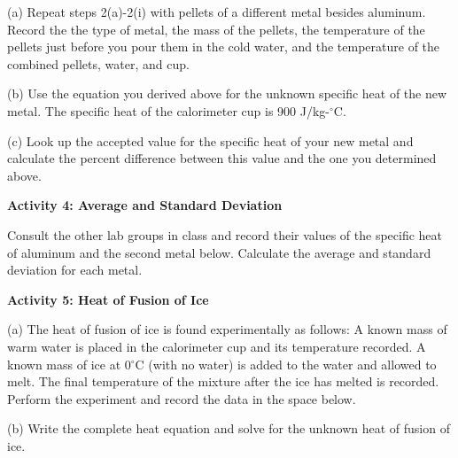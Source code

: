 (a) Repeat steps 2(a)-2(i) with pellets of a different metal besides aluminum.
Record the the type of metal, the mass of the pellets, the temperature of the
pellets just before you pour them in the cold water, and the temperature of the
combined pellets, water, and cup.
\vspace{15mm}

\newpage 

(b) Use the equation you derived above for the unknown specific
heat of the new metal. 
The specific heat of the calorimeter cup is 900 J/kg-\( ^{\circ } \)C.

\vspace{2.5cm}

(c) Look up the accepted value for the specific heat of your new metal and
calculate the percent difference between this value and the one you
determined above. 
\vspace{25mm}

\textbf{Activity 4: Average and Standard Deviation}

Consult the other lab groups in class and record their values of the specific
heat of aluminum and the second metal below.
Calculate the average and standard deviation for each metal.
\vspace{2in}


\textbf{Activity 5: Heat of Fusion of Ice}

(a) The heat of fusion of ice is found experimentally as follows:
A known mass of warm water is placed in the calorimeter cup and its
temperature recorded. A known mass of ice at 0\( ^{\circ } \)C (with
no water) is added to the water and allowed to melt. The final temperature
of the mixture after the ice has melted is recorded. Perform the experiment
and record the data in the space below.

\vspace{25mm}

(b) Write the complete heat equation and solve for the unknown heat
of fusion of ice.\vspace{25mm}

